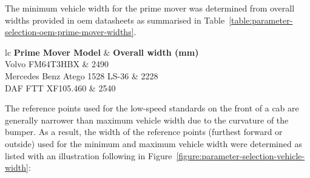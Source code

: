 The minimum vehicle width for the prime mover was determined from overall widths provided in \gls{oem} datasheets as summarised in Table~\ref{table:parameter-selection-oem-prime-mover-widths}.

\begin{table}[H]
	\centering\footnotesize
	\begin{threeparttable}

		\begin{tabulary}{\textwidth}{lc}
			\toprule
			\textbf{Prime Mover Model} & \textbf{Overall width (mm)} \\
			\midrule
			Volvo FM64T3HBX \cite{VolvoTruckCorporation2018FM64T3HBX} & 2490 \\
			Mercedes Benz Atego 1528 LS-36 \cite{MercedesBenzAtego2015} & 2228 \\
			DAF FTT XF105.460 \cite{DAFXF105.4602017} & 2540 \\
			\bottomrule
		\end{tabulary}

		\caption{Selection of \gls{oem} prime mover widths}
		\label{table:parameter-selection-oem-prime-mover-widths}


	\end{threeparttable}
\end{table}

The reference points used for the low-speed standards on the front of a cab are generally narrower than maximum vehicle width due to the curvature of the bumper. As a result, the width of the reference points (furthest forward or outside) used for the minimum and maximum vehicle width were determined as listed with an illustration following in Figure~\ref{figure:parameter-selection-vehicle-width}:

